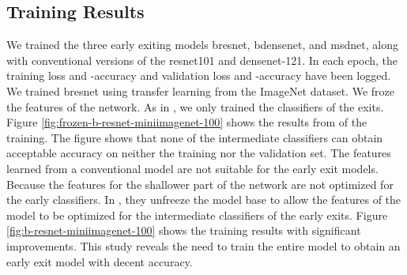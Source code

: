 \subsection{Training Results} \label{sec:ee-results-training}
We trained the three early exiting models \gls{bresnet}, \gls{bdensenet}, and \gls{msdnet}, along with conventional versions of the \gls{resnet}101 and \gls{densenet}-121.  In each epoch, the training loss and -accuracy and validation loss and -accuracy have been logged.
We trained \gls{bresnet} using transfer learning from the ImageNet dataset. We froze the features of the network. As in \cite{leroux_resource-constrained_2015}, we only trained the classifiers of the exits. Figure \ref{fig:frozen-b-resnet-miniimagenet-100} shows the results from of the training. The figure shows that none of the intermediate classifiers can obtain acceptable accuracy on neither the training nor the validation set. The features learned from a conventional model are not suitable for the early exit models. Because the features for the shallower part of the network are not optimized for the early classifiers. In \cite{teerapittayanon_branchynet:_2016}, they unfreeze the model base to allow the features of the model to be optimized for the intermediate classifiers of the early exits. Figure \ref{fig:b-resnet-miniimagenet-100} shows the training results with significant improvements. This study reveals the need to train the entire model to obtain an early exit model with decent accuracy.
